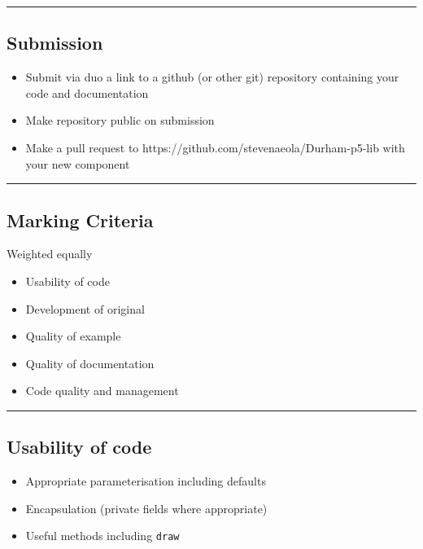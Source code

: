 \documentclass[]{article}
\providecommand{\tightlist}{%
  \setlength{\itemsep}{0pt}\setlength{\parskip}{0pt}}
\begin{document}
\begin{center}\rule{0.5\linewidth}{\linethickness}\end{center}

\hypertarget{submission}{%
\subsection{Submission}\label{submission}}

\begin{itemize}
\tightlist
\item
  Submit via duo a link to a github (or other git) repository containing
  your code and documentation
\item
  Make repository public on submission
\item
  Make a pull request to https://github.com/stevenaeola/Durham-p5-lib
  with your new component
\end{itemize}

\begin{center}\rule{0.5\linewidth}{\linethickness}\end{center}

\hypertarget{marking-criteria}{%
\subsection{Marking Criteria}\label{marking-criteria}}

Weighted equally

\begin{itemize}
\tightlist
\item
  Usability of code
\item
  Development of original
\item
  Quality of example
\item
  Quality of documentation
\item
  Code quality and management
\end{itemize}

\begin{center}\rule{0.5\linewidth}{\linethickness}\end{center}

\hypertarget{usability-of-code}{%
\subsection{Usability of code}\label{usability-of-code}}

\begin{itemize}
\tightlist
\item
  Appropriate parameterisation including defaults
\item
  Encapsulation (private fields where appropriate)
\item
  Useful methods including \texttt{draw}
\end{itemize}
\end{document}
